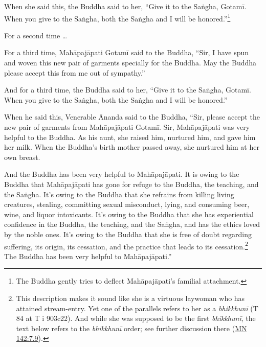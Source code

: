 \documentclass[12pt,openany]{book}%
\begin{document}
When she said this, the Buddha said to her, “Give it to the \textsanskrit{Saṅgha}, \textsanskrit{Gotamī}. When you give to the \textsanskrit{Saṅgha}, both the \textsanskrit{Saṅgha} and I will be honored.”\footnote{The Buddha gently tries to deflect \textsanskrit{Mahāpajāpati}’s familial attachment. } 

For a second time … 

For a third time, \textsanskrit{Mahāpajāpati} \textsanskrit{Gotamī} said to the Buddha, “Sir, I have spun and woven this new pair of garments specially for the Buddha. May the Buddha please accept this from me out of sympathy.” 

And for a third time, the Buddha said to her, “Give it to the \textsanskrit{Saṅgha}, \textsanskrit{Gotamī}. When you give to the \textsanskrit{Saṅgha}, both the \textsanskrit{Saṅgha} and I will be honored.” 

When he said this, Venerable Ānanda said to the Buddha, “Sir, please accept the new pair of garments from \textsanskrit{Mahāpajāpati} \textsanskrit{Gotamī}. Sir, \textsanskrit{Mahāpajāpati} was very helpful to the Buddha. As his aunt, she raised him, nurtured him, and gave him her milk. When the Buddha’s birth mother passed away, she nurtured him at her own breast. 

And the Buddha has been very helpful to \textsanskrit{Mahāpajāpati}. It is owing to the Buddha that \textsanskrit{Mahāpajāpati} has gone for refuge to the Buddha, the teaching, and the \textsanskrit{Saṅgha}. It’s owing to the Buddha that she refrains from killing living creatures, stealing, committing sexual misconduct, lying, and consuming beer, wine, and liquor intoxicants. It’s owing to the Buddha that she has experiential confidence in the Buddha, the teaching, and the \textsanskrit{Saṅgha}, and has the ethics loved by the noble ones. It’s owing to the Buddha that she is free of doubt regarding suffering, its origin, its cessation, and the practice that leads to its cessation.\footnote{This description makes it sound like she is a virtuous laywoman who has attained stream-entry. Yet one of the parallels refers to her as a \textit{\textsanskrit{bhikkhunī}} (T 84 at T i 903c22). And while she was supposed to be the first \textit{\textsanskrit{bhikkhunī}}, the text below refers to the \textit{\textsanskrit{bhikkhunī}} order; see further discussion there (\href{https://suttacentral.net/mn142/en/sujato\#7.9}{MN 142:7.9}). } The Buddha has been very helpful to \textsanskrit{Mahāpajāpati}.” 
\end{document}
